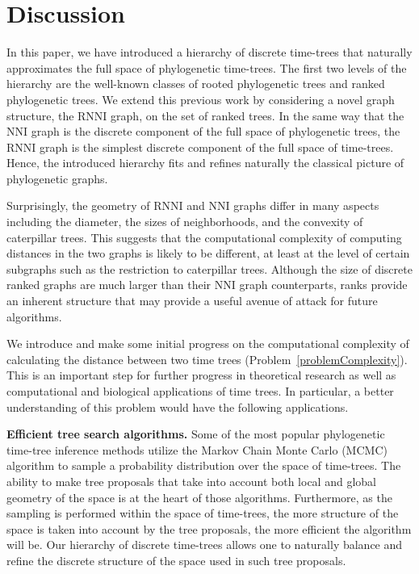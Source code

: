 \documentclass[11pt]{amsart}
\theoremstyle{definition}
\newcommand{\nni}{\mathrm{NNI}}
\newcommand{\rnni}{\mathrm{RNNI}}
\begin{document}
\section{Discussion}

In this paper, we have introduced a hierarchy of discrete time-trees that naturally approximates the full space of phylogenetic time-trees.
The first two levels of the hierarchy are the well-known classes of rooted phylogenetic trees and ranked phylogenetic trees.
We extend this previous work by considering a novel graph structure, the $\rnni$ graph, on the set of ranked trees.
In the same way that the $\nni$ graph is the discrete component of the full space of phylogenetic trees, the $\rnni$ graph is the simplest discrete component of the full space of time-trees.
Hence, the introduced hierarchy fits and refines naturally the classical picture of phylogenetic graphs.

Surprisingly, the geometry of $\rnni$ and $\nni$ graphs differ in many aspects including the diameter, the sizes of neighborhoods, and the convexity of caterpillar trees.
This suggests that the computational complexity of computing distances in the two graphs is likely to be different, at least at the level of certain subgraphs such as the restriction to caterpillar trees.
Although the size of discrete ranked graphs are much larger than their $\nni$ graph counterparts, ranks provide an inherent structure that may provide a useful avenue of attack for future algorithms.

We introduce and make some initial progress on the computational complexity of calculating the distance between two time trees (Problem~\ref{problemComplexity}).
This is an important step for further progress in theoretical research as well as computational and biological applications of time trees.
In particular, a better understanding of this problem would have the following applications.

\textbf{Efficient tree search algorithms.} Some of the most popular phylogenetic time-tree inference methods utilize the Markov Chain Monte Carlo (MCMC) algorithm to sample a probability distribution over the space of time-trees.
The ability to make tree proposals that take into account both local and global geometry of the space is at the heart of those algorithms.
Furthermore, as the sampling is performed within the space of time-trees, the more structure of the space is taken into account by the tree proposals, the more efficient the algorithm will be.
Our hierarchy of discrete time-trees allows one to naturally balance and refine the discrete structure of the space used in such tree proposals.
\end{document}
